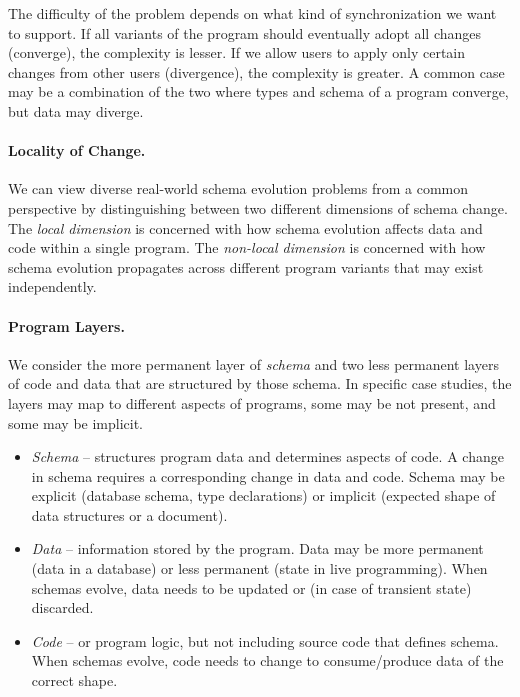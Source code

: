 \documentclass[english,submission]{programming}
\begin{document}
The difficulty of the problem depends on what kind of synchronization we want to support.
If all variants of the program should eventually adopt all changes (converge), the complexity
is lesser. If we allow users to apply only certain changes from other users (divergence), the
complexity is greater. A common case may be a combination of the two where types and schema
of a program converge, but data may diverge.


\paragraph{Locality of Change.}
We can view diverse real-world schema evolution problems from a common perspective by distinguishing between two different dimensions of schema change.
The \emph{local dimension} is concerned with how schema evolution affects data and code within
a single program. The \emph{non-local dimension} is concerned with how schema evolution
propagates across different program variants that may exist independently.

\paragraph{Program Layers.}
We consider the more permanent layer of \emph{schema} and two less permanent layers of code and
data that are structured by those schema. In specific case studies, the layers may map to
different aspects of programs, some may be not present, and some may be implicit.

\begin{itemize}
\item \emph{Schema} -- structures program data and determines aspects of code. A change in schema
  requires a corresponding change in data and code. Schema may be explicit (database schema, type declarations)
  or implicit (expected shape of data structures or a document).
\item \emph{Data} -- information stored by the program. Data may be more permanent (data in a
  database) or less permanent (state in live programming). When schemas evolve, data needs to be
  updated or (in case of transient state) discarded.
\item \emph{Code} -- or program logic, but not including source code that defines schema.
  When schemas evolve, code needs to change to consume/produce data of the correct shape.
\end{itemize}
\end{document}
